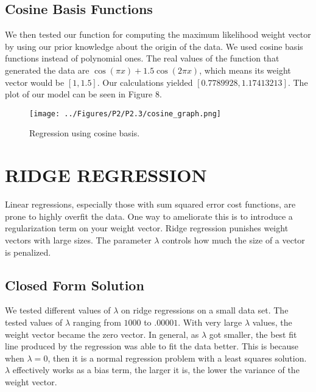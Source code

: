 \documentclass[a4paper,twoside]{article}
\begin{document}
\subsection{Cosine Basis Functions}

We then tested our function for computing the maximum likelihood weight vector by using our prior knowledge about the origin of the data. We used cosine basis functions instead of polynomial ones. The real values of the function that generated the data are $\cos(\pi x)+1.5 \cos(2 \pi x)$, which means its weight vector would be $[1, 1.5]$. Our calculations yielded $[0.7789928, 1.17413213]$. The plot of our model can be seen in Figure 8.

\begin{figure}[h]
  \texttt{[image: ../Figures/P2/P2.3/cosine\_graph.png]}
  \caption{Regression using cosine basis.}
  \label{fig:gradient_converging}
\end{figure}

\vspace{40mm}


\section{\uppercase{Ridge Regression}}

Linear regressions, especially those with sum squared error cost functions, are prone to highly overfit the data. One way to ameliorate this is to introduce a regularization term on your weight vector. Ridge regression punishes weight vectors with large sizes. The parameter $\lambda$ controls how much the size of a vector is penalized. 

\subsection{Closed Form Solution}

We tested different values of $\lambda$ on ridge regressions on a small data set. The tested values of $\lambda$ ranging from $1000$ to $.00001$. With very large $\lambda$ values, the weight vector became the zero vector. In general, as $\lambda$ got smaller, the best fit line produced by the regression was able to fit the data better. This is because when $\lambda = 0$, then it is a normal regression problem with a least squares solution. $\lambda$ effectively works as a bias term, the larger it is, the lower the variance of the weight vector. 
\end{document}
